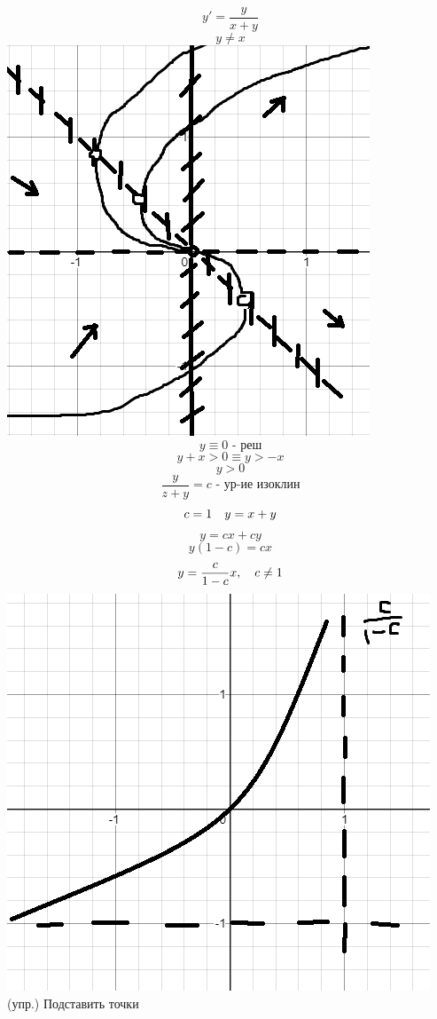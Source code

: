 \documentclass[12pt, fleqn]{article}
\begin{document}
    \begin{Example}
        \[y'=\frac{y}{x+y}\]
        \[y \neq x\]
        \includegraphics[scale=0.3]{pics/resh3.png}\\
        \[y \equiv 0\text{ - реш}\]
        \[y+x>0 \equiv y>-x\]
        \[y>0\]
        \[\frac{y}{z+y}=c \text{ - ур-ие изоклин}\]
        \[c=1 \quad y=x+y\]
        \[y=cx+cy\]
        \[y(1-c)=cx\]
        \[y=\frac{c}{1-c}x,\quad c \neq 1\]
        \includegraphics[scale=0.3]{pics/resh4.png}\\
        (упр.) Подставить точки
    \end{Example}
\end{document}
